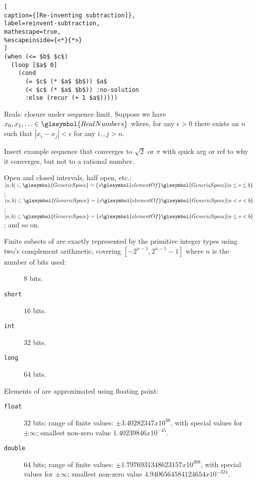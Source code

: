 \begin{minipage}{\linewidth}
\begin{lstlisting}[
caption={[Re-inventing subtraction]},
label=reinvent-subtraction,
mathescape=true,
%escapeinside={<*}{*>}
] 
(when (<= $b$ $c$)
  (loop [$a$ 0]
    (cond 
      (= $c$ (* $a$ $b$)) $a$
      (< $c$ (* $a$ $b$)) :no-solution
      :else (recur (+ 1 $a$)))))
\end{lstlisting}
\end{minipage}

Reals: closure under sequence limit.
Suppose we have $x_0, x_1, \ldots \in \glssymbol{RealNumbers}$
where, for any $\epsilon>0$ there exists an $n$ such that
$|x_i - x_j| < \epsilon$ for any $i,, j > n$.

Insert example sequence that converges to $\sqrt{2}$ or $\pi$
with quick arg or ref to why it converges, but not to a rational
number.


Open and closed intervals, half open, etc.:
$[a,b] \subset \glssymbol{GenericSpace} = 
\setSpec{s \glssymbol{elementOf} \glssymbol{GenericSpace}}
{a \leq s \leq b}$;
$(a,b) \subset \glssymbol{GenericSpace} = 
\setSpec{s \glssymbol{elementOf} \glssymbol{GenericSpace}}
{a < s < b}$;
$[a,b) \subset \glssymbol{GenericSpace} = 
\setSpec{s \glssymbol{elementOf} \glssymbol{GenericSpace}}
{a \leq s < b}$;
and so on.

\lstset{language=Java}


Finite subsets of  are exactly
represented by the primitive integer types using two's complement arithmetic, 
covering $[−2^{n−1}, 2^{n−1} − 1]$ where $n$ is the number of bits used:
\begin{description}
\item[] $8$ bits.
\item[\texttt{short}] $16$ bits.
\item[\texttt{int}] $32$ bits.
\item[\texttt{long}] $64$ bits.
\end{description}

Elements of  are approximated using floating
point:
\begin{description}
\item[\texttt{float}] $32$ bits; range of finite values:
$\pm 3.40282347 x 10^{38}$, with special values for $\pm\infty$;
smallest non-zero value $1.40239846 x 10^{-45}$.
\item[\texttt{double}] $64$ bits;
range of finite values: 
$\pm 1.7976931348623157 x 10^{308}$, with special values for $\pm\infty$;
smallest non-zero value $4.9406564584124654 x 10^{-324}$.
\end{description}

